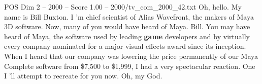 \begin{textsample}{POS Dim 2 – 2000 – Score 1.00 – 2000/tv\_com\_2000\_42.txt}  \label{ex:f2_pos_085}
Oh, hello.
My name is Bill Buxton.
I 'm chief scientist of Alias Wavefront, the makers of Maya 3D software.
Now, many of you would have heard of Maya.
Bill.
You may have heard of Maya, the software used by leading \textbf{game} developers and by virtually every company nominated for a major visual effects award since its inception.
When I heard that our company was lowering the price permanently of our Maya Complete software from \$7,500 to \$1,999, I had a very spectacular reaction.
One I 'll attempt to recreate for you now.
Oh, my God.

\end{textsample}
